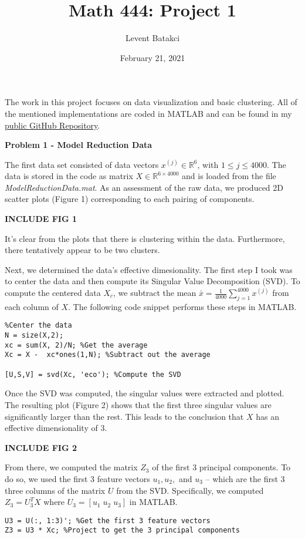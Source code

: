 \documentclass{article}
\title{Math 444: Project 1}
\author{Levent Batakci}
\date{February 21, 2021} %
\begin{document}
\maketitle

The work in this project focuses on data visualization and basic clustering.
All of the mentioned implementations are coded in MATLAB and can be found in my \href{https://github.com/Levent-Batakci/Assignment1-MATH444}{public GitHub Repository}. 

\bigskip
{\Large {\bf Problem 1 - Model Reduction Data}}
\bigskip

The first data set consisted of data vectors $x^{(j)} \in \mathbb{R}^6$, with $1 \leq j \leq 4000$. 
The data is stored in the code as matrix $X\in \mathbb{R}^{6\times4000}$ and is loaded from the file \textit{ModelReductionData.mat}.
As an assessment of the raw data, we produced 2D scatter plots (Figure 1) corresponding to each pairing of components.

\textbf{INCLUDE FIG 1}

It's clear from the plots that there is clustering within the data.
Furthermore, there tentatively appear to be two clusters.

Next, we determined the data's effective dimesionality.
The first step I took was to center the data and then compute its Singular Value Decomposition (SVD).
To compute the centered data $X_c$, we subtract the mean $\bar{x}=\frac{1}{4000}\sum_{j=1}^{4000}x^{(j)}$ from each column of $X$.
The following code snippet performs these steps in MATLAB.
\begin{verbatim}
%Center the data
N = size(X,2);
xc = sum(X, 2)/N; %Get the average
Xc = X -  xc*ones(1,N); %Subtract out the average

[U,S,V] = svd(Xc, 'eco'); %Compute the SVD
\end{verbatim}

Once the SVD was computed, the singular values were extracted and plotted.
The resulting plot (Figure 2) shows that the first three singular values are significantly larger than the rest.
This leads to the conclusion that $X$ has an effective dimensionality of 3.

\textbf{INCLUDE FIG 2}

From there, we computed the matrix $Z_3$ of the first 3 principal components.
To do so, we used the first 3 feature vectors $u_1, u_2,$ and $u_3$ -- which are the first 3 three columns of the matrix $U$ from the SVD.
Specifically, we computed $Z_3 = U_3^TX$ where $U_3 = [u_1\;u_2\;u_3]$ in MATLAB.
\begin{verbatim}
U3 = U(:, 1:3)'; %Get the first 3 feature vectors
Z3 = U3 * Xc; %Project to get the 3 principal components
\end{verbatim}
 
\end{document}
